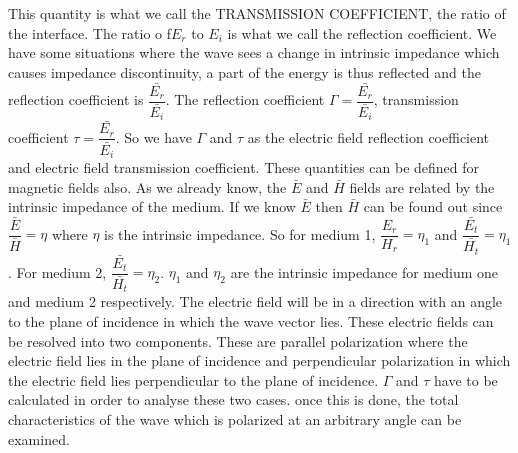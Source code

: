 This quantity is what we call the TRANSMISSION COEFFICIENT, the ratio of the interface. The ratio o f$ E_r$ to $E_i$ is what we call the reflection coefficient. We have some situations where the wave sees a change in intrinsic impedance which causes impedance discontinuity, a part of the energy is thus reflected and the reflection coefficient is $\dfrac{\bar{E_r}}{\bar{E_i}}$. The reflection coefficient $\Gamma=\dfrac{\bar{E_r}}{\bar{E_i}}$, transmission coefficient $\tau=\dfrac{\bar{E_r}}{\bar{E_i}}$. So we have $\Gamma$ and $\tau$ as the electric field reflection coefficient and electric field transmission coefficient. These quantities can be defined for magnetic fields also. As we already know, the $\bar{E}$ and $\bar{ H}$ fields are related by the intrinsic impedance of the medium. If we know $\bar{E}$ then $\bar{H}$ can be found out since $\dfrac{\bar{E}}{\bar{H}}=\eta$ where $\eta$ is the intrinsic impedance. So for medium 1,  $\dfrac{E_r}{H_r}=\eta_1$  and $\dfrac{\bar{E_t}}{\bar{H_t}}=\eta_1$. For medium 2, $\dfrac{\bar{E_t}}{\bar{H_t}}=\eta_2$. $\eta_1$ and $\eta_2$ are the intrinsic impedance for medium one and medium 2 respectively. The electric field will be in a direction with an angle to the plane of incidence in which the wave vector lies. These electric fields can be resolved into two components. These are parallel polarization where the electric field lies in the plane of incidence and perpendicular polarization in which the electric field lies perpendicular to the plane of incidence. $\Gamma$ and $\tau$ have to be calculated in order to analyse these two cases. once this is done, the total characteristics of the wave which is polarized at an arbitrary angle can be examined.
